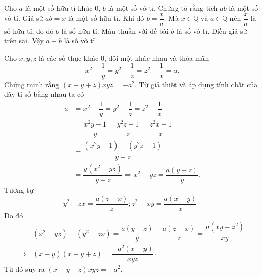 \begin{vn}
Cho $a$ là một số hữu tỉ khác $0$, $b$ là một số vô tỉ. Chứng tỏ rằng tích $ab$ là một số vô tỉ.
\loigiai
{
Giả sử $ab=x$ là một số hữu tỉ. Khi đó $b=\dfrac{x}{a}$. Mà $x\in\mathbb{Q}$ và $a\in\mathbb{Q}$ nên $\dfrac{x}{a}$ là số hữu tỉ, do đó $b$ là số hữu tỉ. Mâu thuẫn với đề bài $b$ là số vô tỉ. Điều giả sử trên sai. Vậy $a+b$ là số vô tỉ.
}
\end{vn}

\begin{vn}
Cho $x,y,z$ là các số thực khác $0$, đôi một khác nhau và thỏa mãn $$x^2-\dfrac{1}{y}=y^2-\dfrac{1}{z}=z^2-\dfrac{1}{x}=a.$$
Chứng minh rằng $(x+y+z)xyz=-a^2.$
\loigiai
{
Từ giả thiết và áp dụng tính chất của dãy tỉ số bằng nhau ta có $$\begin{aligned}
a&=x^2-\dfrac{1}{y}=y^2-\dfrac{1}{z}=z^2-\dfrac{1}{x}\\ 
&=\dfrac{x^2y-1}{y}=\dfrac{y^2z-1}{z}=\dfrac{z^2x-1}{x}\\
&=\dfrac{(x^2y-1)-(y^2z-1)}{y-z}\\
&=\dfrac{y(x^2-yz)}{y-z}\Rightarrow x^2-yz=\dfrac{a(y-z)}{y}.
\end{aligned}$$
Tương tự $$y^2-zx=\dfrac{a(z-x)}{z}; z^2-xy=\dfrac{a(x-y)}{x}\cdot$$
Do đó $$\begin{aligned}
&(x^2-yz)-(y^2-zx)=\dfrac{a(y-z)}{y}-\dfrac{a(z-x)}{z}=\dfrac{a(xy-z^2)}{xy}\\ 
\Rightarrow&(x-y)(x+y+z)=\dfrac{-a^2(x-y)}{xyz}\cdot
\end{aligned}$$
Từ đó suy ra $(x+y+z)xyz=-a^2.$
}
\end{vn}
